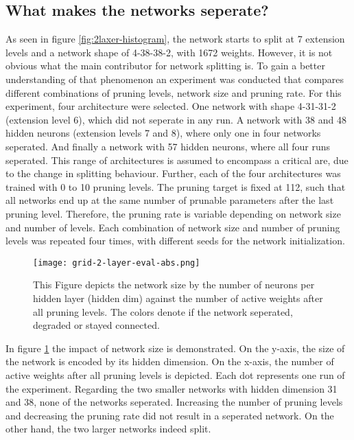 \subsection{What makes the networks seperate?}
As seen in figure \ref{fig:2laxer-histogram}, the network starts to split at 7 extension levels and a network shape of 4-38-38-2, with 1672 weights.
However, it is not obvious what the main contributor for network splitting is.
To gain a better understanding of that phenomenon an experiment was conducted that compares different combinations of pruning levels, network size and pruning rate.
For this experiment, four architecture were selected.
One network with shape 4-31-31-2 (extension level 6), which did not seperate in any run.
A network with 38 and 48 hidden neurons (extension levels 7 and 8), where only one in four networks seperated.
And finally a network with 57 hidden neurons, where all four runs seperated.
This range of architectures is assumed to encompass a critical are, due to the change in splitting behaviour.
Further, each of the four architectures was trained with 0 to 10 pruning levels.
The pruning target is fixed at 112, such that all networks end up at the same number of prunable parameters after the last pruning level.
Therefore, the pruning rate is variable depending on network size and number of levels.
Each combination of network size and number of pruning levels was repeated four times, with different seeds for the network initialization.

\begin{figure}[ht]
    \centering
    \texttt{[image: grid-2-layer-eval-abs.png]}
    \caption{This Figure depicts the network size by the number of neurons per hidden layer (hidden dim) against the number of active weights after all pruning levels.
    The colors denote if the network seperated, degraded or stayed connected.}
    \label{fig:grid-1}
\end{figure}

In figure \ref{fig:grid-1} the impact of network size is demonstrated.
On the y-axis, the size of the network is encoded by its hidden dimension.
On the x-axis, the number of active weights after all pruning levels is depicted.
Each dot represents one run of the experiment.
Regarding the two smaller networks with hidden dimension 31 and 38, none of the networks seperated. 
Increasing the number of pruning levels and decreasing the pruning rate did not result in a seperated network.
On the other hand, the two larger networks indeed split.

